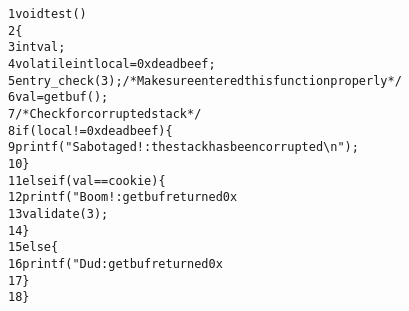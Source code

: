 \begin{alltt}
{\scriptsize   1} void test()
{\scriptsize   2} \verb:{:
{\scriptsize   3}     int val;
{\scriptsize   4}     volatile int local = 0xdeadbeef;
{\scriptsize   5}     entry_check(3);  /* Make sure entered this function properly */
{\scriptsize   6}     val = getbuf();
{\scriptsize   7}     /* Check for corrupted stack */
{\scriptsize   8}     if (local != 0xdeadbeef) \verb:{:
{\scriptsize   9}         printf("Sabotaged!: the stack has been corrupted\verb:\n:");
{\scriptsize  10}     \verb:}:
{\scriptsize  11}     else if (val == cookie) \verb:{:
{\scriptsize  12}         printf("Boom!: getbuf returned 0x%x\verb:\n:", val);
{\scriptsize  13}         validate(3);
{\scriptsize  14}     \verb:}:
{\scriptsize  15}     else \verb:{:
{\scriptsize  16}         printf("Dud: getbuf returned 0x%x\verb:\n:", val);
{\scriptsize  17}     \verb:}:
{\scriptsize  18} \verb:}:
\end{alltt}
